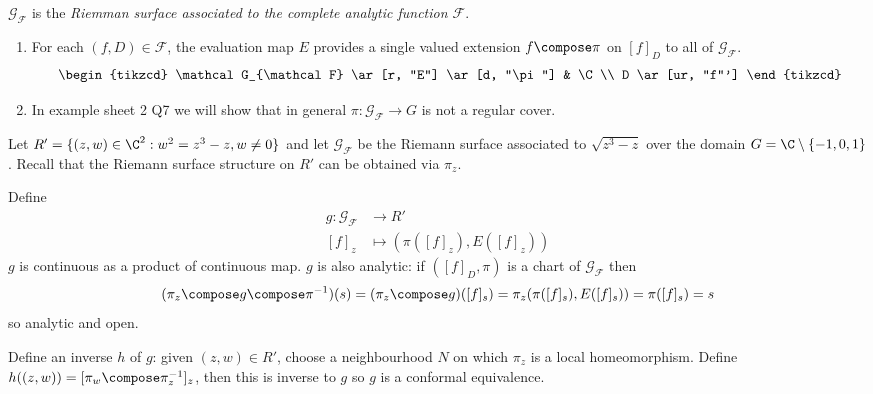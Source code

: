 \documentclass[a4paper]{article}
\begin{document}
\begin{definition}
  \(\mathcal G_{\mathcal F}\) is the \emph{Riemman surface associated to the complete analytic function \(\mathcal F\)}.
\end{definition}

\begin{remark}\leavevmode
  \begin{enumerate}
  \item For each \((f, D) \in \mathcal F\), the evaluation map \(E\) provides a single valued extension \(f \compose \pi\) on \([f]_D\) to all of \(\mathcal G_{\mathcal F}\).
    \[
      \begin{tikzcd}
        \mathcal G_{\mathcal F} \ar[r, "E"] \ar[d, "\pi"] & \C \\
        D \ar[ur, "f"']
      \end{tikzcd}
    \]
  \item In example sheet 2 Q7 we will show that in general \(\pi: \mathcal G_{\mathcal F} \to G\) is not a regular cover.
  \end{enumerate}
\end{remark}

\begin{eg}
  Let \(R' = \{(z, w) \in \C^2: w^2 = z^3 - z, w \neq 0\}\) and let \(\mathcal G_{\mathcal F}\) be the Riemann surface associated to \(\sqrt{z^3 - z}\) over the domain \(G = \C \setminus\{-1, 0, 1\}\). Recall that the Riemann surface structure on \(R'\) can be obtained via \(\pi_z\).

  Define
  \begin{align*}
    g: \mathcal G_{\mathcal F} &\to R' \\
    [f]_z &\mapsto (\pi([f]_z), E([f]_z))
  \end{align*}
  \(g\) is continuous as a product of continuous map. \(g\) is also analytic: if \(([f]_D, \pi)\) is a chart of \(\mathcal G_{\mathcal F}\) then
  \[
    (\pi_z \compose g \compose \pi^{-1})(s) = (\pi_z \compose g)([f]_s) = \pi_z(\pi([f]_s), E([f]_s)) = \pi([f]_s) = s
  \]
  so analytic and open.

  Define an inverse \(h\) of \(g\): given \((z, w) \in R'\), choose a neighbourhood \(N\) on which \(\pi_z\) is a local homeomorphism. Define \(h((z, w)) = [\pi_w \compose \pi_z^{-1}]_z\), then this is inverse to \(g\) so \(g\) is a conformal equivalence.
\end{eg}
\end{document}
